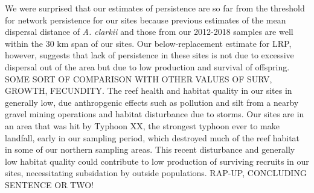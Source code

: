 \documentclass[12pt, oneside]{article}   	%
\begin{document}
We were surprised that our estimates of persistence are so far from the threshold for network persistence for our sites because previous estimates of the mean dispersal distance of \textit{A. clarkii} \citep[10 km][]{pinsky2010using} and those from our 2012-2018 samples \citep[range from XX - XX km for individual-year kernels, XX for all-years kernel, which is used in this analysis]{catalanoInPrepconnectivity} are well within the 30 km span of our sites. Our below-replacement estimate for LRP, however, suggests that lack of persistence in these sites is not due to excessive dispersal out of the area but due to low production and survival of offspring. SOME SORT OF COMPARISON WITH OTHER VALUES OF SURV, GROWTH, FECUNDITY. The reef health and habitat quality in our sites in generally low, due anthropgenic effects such as pollution and silt from a nearby gravel mining operations and habitat disturbance due to storms. Our sites are in an area that was hit by Typhoon XX, the strongest typhoon ever to make landfall, early in our sampling period, which destroyed much of the reef habitat in some of our northern sampling areas. This recent disturbance and generally low habitat quality could contribute to low production of surviving recruits in our sites, necessitating subsidation by outside populations. RAP-UP, CONCLUDING SENTENCE OR TWO!



\end{document}

